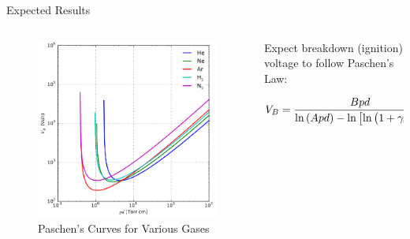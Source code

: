 \documentclass{beamer}
\begin{document}
  \begin{frame}{Expected Results}
  \begin{columns}
  	\begin{column}{0.4\textwidth}
  	\begin{center}
      \begin{figure}[H]
      \includegraphics[width=\textwidth]{../resources/paschen-curves.png}
      \caption{Paschen's Curves for Various Gases\footnotemark}
      \label{fig: paschens-curves}
      \end{figure}
    \end{center}
    \end{column}
    
    
    \begin{column}{0.6\columnwidth}
    Expect breakdown (ignition) voltage to follow Paschen's Law:
    
    
    \begin{equation}
    V_B = \frac{B p d}{\ln{\left( A p d \right)} - \ln{\left[ \ln{\left( 1 + \gamma_{\rm{se}}^{-1} \right)} \right]}}
    \label{eqn: paschen-law}
    \end{equation}
    \end{column}
  \end{columns}
  
  \end{frame}
  
\end{document}
